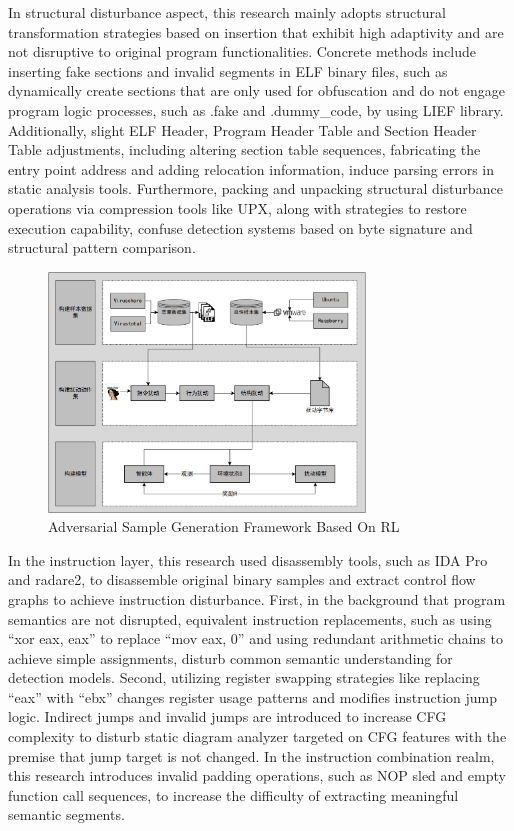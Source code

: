 In structural disturbance aspect, this research mainly adopts structural transformation strategies based on insertion that exhibit high adaptivity and are not disruptive to original program functionalities. Concrete methods include inserting fake sections and invalid segments in ELF binary files, such as dynamically create sections that are only used for obfuscation and do not engage program logic processes, such as .fake and .dummy\_code, by using LIEF \cite{LIEF2025} library. Additionally, slight ELF Header, Program Header Table and Section Header Table adjustments, including altering section table sequences, fabricating the entry point address and adding relocation information, induce parsing errors in static analysis tools. Furthermore, packing and unpacking structural disturbance operations via compression tools like UPX, along with strategies to restore execution capability, confuse detection systems based on byte signature and structural pattern comparison. 

\begin{figure}[hbt]
	\centering
	\includegraphics[width=0.75\textwidth]{figures/3.2}
	\caption{Adversarial Sample Generation Framework Based On RL}\label{fig:3.2}
\end{figure}

In the instruction layer, this research used disassembly tools, such as IDA Pro and radare2, to disassemble original binary samples and extract control flow graphs to achieve instruction disturbance. First, in the background that program semantics are not disrupted, equivalent instruction replacements, such as using “xor eax, eax” to replace “mov eax, 0” and using redundant arithmetic chains to achieve simple assignments, disturb common semantic understanding for detection models. Second, utilizing register swapping strategies like replacing “eax” with “ebx” changes register usage patterns and modifies instruction jump logic. Indirect jumps and invalid jumps are introduced to increase CFG complexity to disturb static diagram analyzer targeted on CFG features with the premise that jump target is not changed. In the instruction combination realm, this research introduces invalid padding operations, such as NOP sled and empty function call sequences, to increase the difficulty of extracting meaningful semantic segments.

